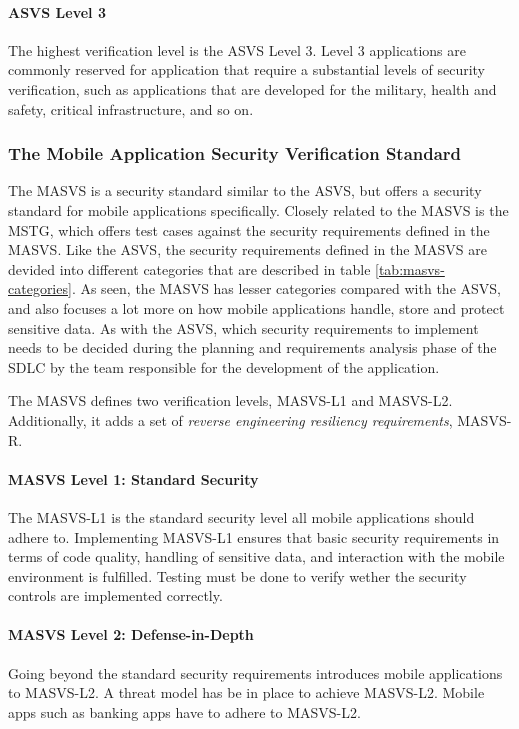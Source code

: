 \paragraph{ASVS Level 3}
The highest verification level is the ASVS Level 3. Level 3 applications are commonly reserved for application that require a substantial levels of security verification, such as applications that are developed for the military, health and safety, critical infrastructure, and so on.

\subsubsection{The Mobile Application Security Verification Standard}
The MASVS is a security standard similar to the ASVS, but offers a security standard for mobile applications specifically. Closely related to the MASVS is the MSTG, which offers test cases against the security requirements defined in the MASVS. Like the ASVS, the security requirements defined in the MASVS are devided into different categories that are described in table \ref{tab:masvs-categories}. As seen, the MASVS has lesser categories compared with the ASVS, and also focuses a lot more on how mobile applications handle, store and protect sensitive data. As with the ASVS, which security requirements to implement needs to be decided during the planning and requirements analysis phase of the SDLC by the team responsible for the development of the application.

The MASVS defines two verification levels, MASVS-L1 and MASVS-L2. Additionally, it adds a set of \emph{reverse engineering resiliency requirements}, MASVS-R.

\paragraph{MASVS Level 1: Standard Security}
The MASVS-L1 is the standard security level all mobile applications should adhere to. Implementing MASVS-L1 ensures that basic security requirements in terms of code quality, handling of sensitive data, and interaction with the mobile environment is fulfilled. Testing must be done to verify wether the security controls are implemented correctly.

\paragraph{MASVS Level 2: Defense-in-Depth}
Going beyond the standard security requirements introduces mobile applications to MASVS-L2. A threat model has be in place to achieve MASVS-L2. Mobile apps such as banking apps have to adhere to MASVS-L2.

